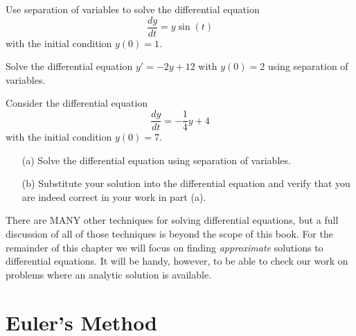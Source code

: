 \begin{problem}
    Use separation of variables to solve the differential equation 
    \[ \frac{dy}{dt} = y\sin(t) \]
    with the initial condition $y(0) = 1$.
\end{problem}

\begin{problem}
    Solve the differential equation $y' = -2y + 12$ with $y(0) = 2$ using separation of
    variables. 
\end{problem}

\begin{problem}
    Consider the differential equation
    \[ \frac{dy}{dt} = -\frac{1}{4} y + 4 \]
    with the initial condition $y(0) = 7$.  
    \begin{enumerate}
        \item[(a)] Solve the differential equation using separation of variables.
        \item[(b)] Substitute your solution into the differential equation and verify that
            you are indeed correct in your work in part (a).
    \end{enumerate}
\end{problem}

There are MANY other techniques for solving differential equations, but a full discussion
of all of those techniques is beyond the scope of this book.  For the remainder of this
chapter we will focus on finding {\it approximate} solutions to differential equations.
It will be handy, however, to be able to check our work on problems where an analytic
solution is available.

\newpage\section{Euler's Method}

